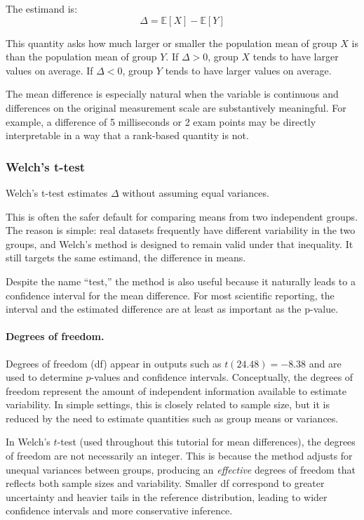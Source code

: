 \documentclass[11pt]{article}
\begin{document}
The estimand is:
\begin{equation}
\Delta = \mathbb{E}[X] - \mathbb{E}[Y]
\end{equation}

This quantity asks how much larger or smaller the population mean of group $X$ is than the population mean of group $Y$. If $\Delta > 0$, group $X$ tends to have larger values on average. If $\Delta < 0$, group $Y$ tends to have larger values on average.

The mean difference is especially natural when the variable is continuous and differences on the original measurement scale are substantively meaningful. For example, a difference of 5 milliseconds or 2 exam points may be directly interpretable in a way that a rank-based quantity is not.

\subsubsection{Welch's t-test}

Welch's t-test \citep{welch1947generalization} estimates $\Delta$ without assuming equal variances.

This is often the safer default for comparing means from two independent groups. The reason is simple: real datasets frequently have different variability in the two groups, and Welch's method is designed to remain valid under that inequality. It still targets the same estimand, the difference in means.

Despite the name ``test,'' the method is also useful because it naturally leads to a confidence interval for the mean difference. For most scientific reporting, the interval and the estimated difference are at least as important as the p-value.

\paragraph{Degrees of freedom.}
Degrees of freedom (df) appear in outputs such as $t(24.48) = -8.38$ and are used to determine $p$-values and confidence intervals. Conceptually, the degrees of freedom represent the amount of independent information available to estimate variability. In simple settings, this is closely related to sample size, but it is reduced by the need to estimate quantities such as group means or variances.

In Welch's $t$-test (used throughout this tutorial for mean differences), the degrees of freedom are not necessarily an integer. This is because the method adjusts for unequal variances between groups, producing an \emph{effective} degrees of freedom that reflects both sample sizes and variability. Smaller df correspond to greater uncertainty and heavier tails in the reference distribution, leading to wider confidence intervals and more conservative inference.
\end{document}
